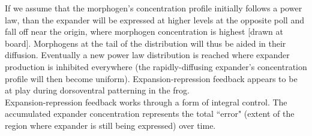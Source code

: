 \documentclass{article}
\begin{document}
If we assume that the morphogen's concentration profile initially follows a power law, than the expander will be expressed at higher levels at the opposite poll and fall off near the origin, where morphogen concentration is highest [drawn at board]. Morphogens at the tail of the distribution will thus be aided in their diffusion. Eventually a new power law distribution is reached where expander production is inhibited everywhere (the rapidly-diffusing expander's concentration profile will then become uniform). Expansion-repression feedback appears to be at play during dorsoventral patterning in the frog.\\

Expansion-repression feedback works through a form of integral control. The accumulated expander concentration represents the total ``error" (extent of the region where expander is still being expressed) over time.
\end{document}
